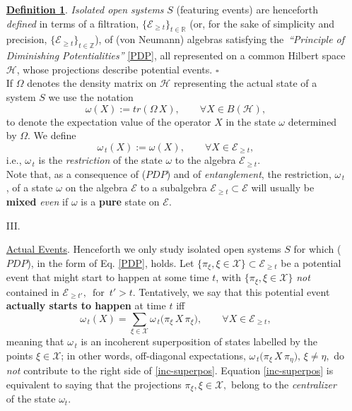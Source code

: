 \documentclass[a4paper,11pt]{article}
\begin{document}
\begin{enumerate}
{\underline{\bf{Definition 1}}. \textit{Isolated open systems} $S$ (featuring events) are henceforth \textit{defined} in terms of a filtration, $\lbrace \mathcal{E}_{\geq t} \rbrace_{t \in \mathbb{R}}$ (or, for the sake of simplicity and precision, $\lbrace \mathcal{E}_{\geq t} \rbrace_{t \in \mathbb{Z}}$), of (von Neumann) algebras satisfying the \,\textit{``Principle of Diminishing Potentialities''} \eqref{PDP}, all represented on a common Hilbert space $\mathcal{H}$, whose projections describe potential events. \hspace{4.5cm} $\square$\\

If $\Omega$ denotes the density matrix on $\mathcal{H}$ representing the actual state of a system $S$ we use the notation
$$\omega(X):= tr(\Omega\,X), \qquad \forall X \in B(\mathcal{H}),$$
to denote the expectation value of the operator $X$ in the state $\omega$ determined by $\Omega$. We define
\begin{equation}\label{state-rest}
\omega_{\,t}(X):= \omega(X), \qquad \forall X \in \mathcal{E}_{\geq t},
\end{equation}
i.e., $\omega_{\,t}$ is the \textit{restriction} of the state $\omega$ to the algebra $\mathcal{E}_{\geq t}$.\\
Note that, as a consequence of ($PDP$) and of \textit{entanglement}, the restriction, $\omega_{\,t}$, of a state $\omega$ on the algebra
$\mathcal{E}$ to a subalgebra $\mathcal{E}_{\geq t} \subset \mathcal{E}$ will usually be {\bf{mixed}} \textit{even} if $\omega$ is a {\bf{pure}} state on $\mathcal{E}$.
}\\

\item[III.]{\underline{Actual Events}. 
Henceforth we only study isolated open systems $S$ for which ($PDP$), in the form of Eq. \eqref{PDP}, holds. Let \mbox{$\lbrace \pi_{\xi}, \xi \in \mathcal{X} \rbrace \subset \mathcal{E}_{\geq t}$} be a potential event that might start to happen at some time $t$, with  \mbox{$\lbrace \pi_{\xi}, \xi \in \mathcal{X} \rbrace$} \textit{not} contained in $\mathcal{E}_{\geq t'}, \,\text{  for   }\, t'>t$. Tentatively, we say that this potential event {\bf{actually starts to happen}} at time $t$ iff
\begin{equation}\label{inc-superpos}
\omega_{\,t}(X)=\sum_{\xi \in \mathcal{X}} \omega_{\,t}\big( \pi_{\xi} \,X\, \pi_{\xi} \big), \qquad \forall X \in \mathcal{E}_{\geq t},
\end{equation}
meaning that $\omega_{\,t}$ is an incoherent superposition of states labelled by the points $\xi \in \mathcal{X}$; in other words, off-diagonal expectations, 
$\omega_{\,t}\big( \pi_{\xi}\,X\, \pi_{\eta} \big), \, \xi \not= \eta,$ do \textit{not} contribute to the right side of \eqref{inc-superpos}.
Equation \eqref{inc-superpos} is equivalent to saying that the projections $\pi_{\xi}, \xi \in \mathcal{X},$ belong to the \textit{centralizer} of the state $\omega_t$.

}
\end{enumerate}
\end{document}
